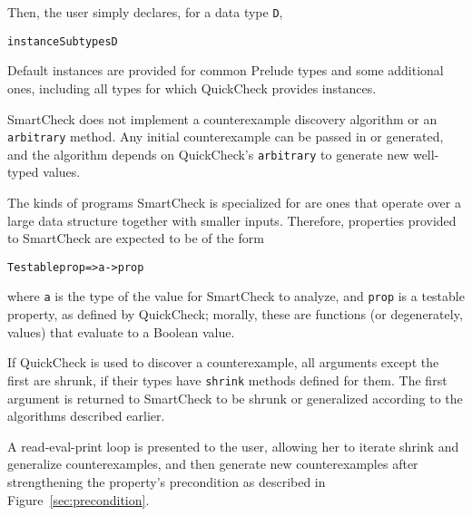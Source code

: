 \documentclass{sigplanconf}
\newenvironment{code}{\begin{alltt}}{\end{alltt}}
\newcommand{\ttp}[1]{\texttt{#1}}
\begin{document}
Then, the user simply declares, for a data type \ttp{D},
%
\begin{code}
instance Subtypes D
\end{code}
%
Default instances are provided for common Prelude types and some additional
ones, including all types for which QuickCheck provides instances.

SmartCheck does not implement a counterexample discovery algorithm or an
\ttp{arbitrary} method.  Any initial counterexample can be passed in or
generated, and the algorithm depends on QuickCheck's \ttp{arbitrary} to generate new
well-typed values.

The kinds of programs SmartCheck is specialized for are ones that operate over a
large data structure together with smaller inputs.  Therefore, properties
provided to SmartCheck are expected to be of the form
%
\begin{code}
Testable prop => a -> prop
\end{code}
%
where \ttp{a} is the type of the value for SmartCheck to analyze, and \ttp{prop}
is a testable property, as defined by QuickCheck; morally, these are functions
(or degenerately, values) that evaluate to a Boolean value.

If QuickCheck is used to discover a counterexample, all arguments except the
first are shrunk, if their types have \ttp{shrink} methods defined for them.
The first argument is returned to SmartCheck to be shrunk or generalized
according to the algorithms described earlier.


A read-eval-print loop is presented to the user, allowing her to iterate shrink
and generalize counterexamples, and then generate new counterexamples after
strengthening the property's precondition as described in
Figure~\ref{sec:precondition}.
\end{document}
